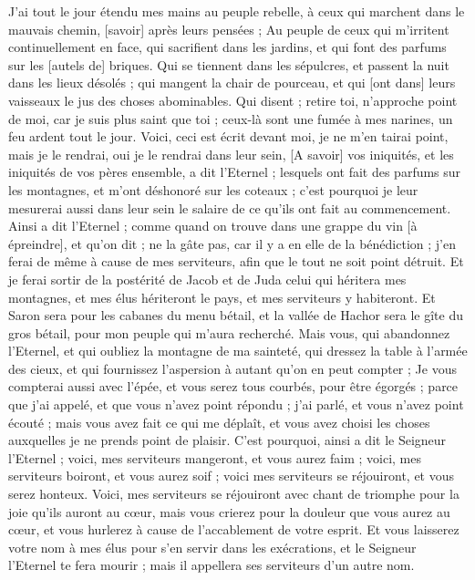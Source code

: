 \begin{multicols}{2}
J'ai tout le jour étendu mes mains au peuple rebelle, à ceux qui marchent dans le mauvais chemin, [savoir] après leurs pensées ;
Au peuple de ceux qui m'irritent continuellement en face, qui sacrifient dans les jardins, et qui font des parfums sur les [autels de] briques.
Qui se tiennent dans les sépulcres, et passent la nuit dans les lieux désolés ; qui mangent la chair de pourceau, et qui [ont dans] leurs vaisseaux le jus des choses abominables.
Qui disent ; retire toi, n'approche point de moi, car je suis plus saint que toi ; ceux-là sont une fumée à mes narines, un feu ardent tout le jour.
Voici, ceci est écrit devant moi, je ne m'en tairai point, mais je le rendrai, oui je le rendrai dans leur sein,
[A savoir] vos iniquités, et les iniquités de vos pères ensemble, a dit l'Eternel ; lesquels ont fait des parfums sur les montagnes, et m'ont déshonoré sur les coteaux ; c'est pourquoi je leur mesurerai aussi dans leur sein le salaire de ce qu'ils ont fait au commencement.
Ainsi a dit l'Eternel ; comme quand on trouve dans une grappe du vin [à épreindre], et qu'on dit ; ne la gâte pas, car il y a en elle de la bénédiction ; j'en ferai de même à cause de mes serviteurs, afin que le tout ne soit point détruit.
Et je ferai sortir de la postérité de Jacob et de Juda celui qui héritera mes montagnes, et mes élus hériteront le pays, et mes serviteurs y habiteront.
Et Saron sera pour les cabanes du menu bétail, et la vallée de Hachor sera le gîte du gros bétail, pour mon peuple qui m'aura recherché.
Mais vous, qui abandonnez l'Eternel, et qui oubliez la montagne de ma sainteté, qui dressez la table à l'armée des cieux, et qui fournissez l'aspersion à autant qu'on en peut compter ;
Je vous compterai aussi avec l'épée, et vous serez tous courbés, pour être égorgés ; parce que j'ai appelé, et que vous n'avez point répondu ; j'ai parlé, et vous n'avez point écouté ; mais vous avez fait ce qui me déplaît, et vous avez choisi les choses auxquelles je ne prends point de plaisir.
C'est pourquoi, ainsi a dit le Seigneur l'Eternel ; voici, mes serviteurs mangeront, et vous aurez faim ; voici, mes serviteurs boiront, et vous aurez soif ; voici mes serviteurs se réjouiront, et vous serez honteux.
Voici, mes serviteurs se réjouiront avec chant de triomphe pour la joie qu'ils auront au cœur, mais vous crierez pour la douleur que vous aurez au cœur, et vous hurlerez à cause de l'accablement de votre esprit.
Et vous laisserez votre nom à mes élus pour s'en servir dans les exécrations, et le Seigneur l'Eternel te fera mourir ; mais il appellera ses serviteurs d'un autre nom.

\end{multicols}
